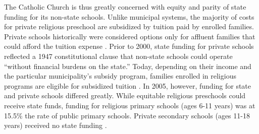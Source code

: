 The Catholic Church is thus greatly concerned with equity and parity of state funding for its non-state schools. Unlike municipal systems, the majority of costs for private religious preschool are subsidized by tuition paid by enrolled families. Private schools historically were considered options only for affluent families that could afford the tuition expense \citep{Hohnerlein_2009_Paradox-Public-Preschools}. Prior to 2000, state funding for private schools reflected a 1947 constitutional clause that non-state schools could operate ``without financial burdens on the state.'' Today, depending on their income and the particular municipality's subsidy program, families enrolled in religious programs are eligible for subsidized tuition \citep{Hohnerlein_2009_Paradox-Public-Preschools}. In 2005, however, funding for state and private schools differed greatly. While equitable religious preschools could receive state funds, funding for religious primary schools (ages 6-11 years) was at 15.5\% the rate of public primary schools. Private secondary schools (ages 11-18 years) received no state funding \citep{Becchi-Ferrari_1990_Pub-Inf-Centres-Italy}. 
